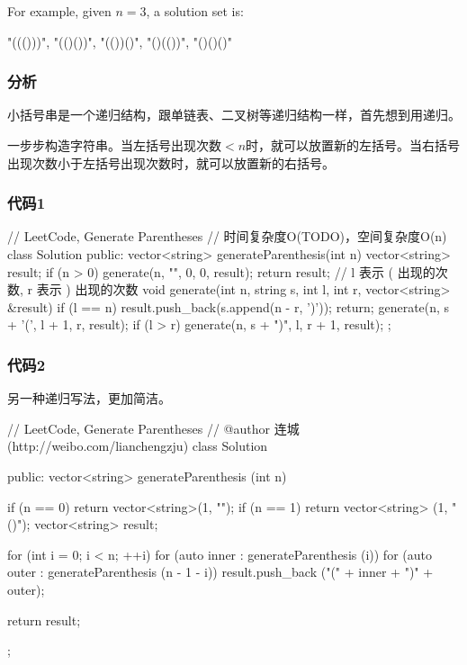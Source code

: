 For example, given $n = 3$, a solution set is:
\begin{Code}
"((()))", "(()())", "(())()", "()(())", "()()()"
\end{Code}

\subsubsection{分析}
小括号串是一个递归结构，跟单链表、二叉树等递归结构一样，首先想到用递归。

一步步构造字符串。当左括号出现次数$<n$时，就可以放置新的左括号。当右括号出现次数小于左括号出现次数时，就可以放置新的右括号。


\subsubsection{代码1}
\begin{Code}
// LeetCode, Generate Parentheses
// 时间复杂度O(TODO)，空间复杂度O(n)
class Solution {
public:
    vector<string> generateParenthesis(int n) {
        vector<string> result;
        if (n > 0) generate(n, "", 0, 0, result);
        return result;
    }
    // l 表示 ( 出现的次数, r 表示 ) 出现的次数
    void generate(int n, string s, int l, int r, vector<string> &result) {
        if (l == n) {
            result.push_back(s.append(n - r, ')'));
            return;
        }
        generate(n, s + '(', l + 1, r, result);
        if (l > r) generate(n, s + ")", l, r + 1, result);
    }
};
\end{Code}


\subsubsection{代码2}
另一种递归写法，更加简洁。
\begin{Code}
// LeetCode, Generate Parentheses
// @author 连城 (http://weibo.com/lianchengzju)
class Solution {
public:
    vector<string> generateParenthesis (int n) {
        if (n == 0) return vector<string>(1, "");
        if (n == 1) return vector<string> (1, "()");
        vector<string> result;

        for (int i = 0; i < n; ++i)
            for (auto inner : generateParenthesis (i))
                for (auto outer : generateParenthesis (n - 1 - i))
                    result.push_back ("(" + inner + ")" + outer);

        return result;
    }
};
\end{Code}


